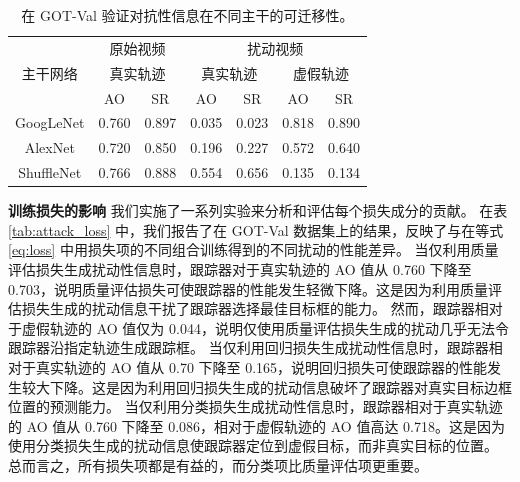 \begin{table}[t]
\centering
\caption{在 GOT-Val 验证对抗性信息在不同主干的可迁移性。}
\begin{tabular}{c cc cc cc} 
\toprule
\multirow{3}{*}[-6pt]{主干网络} & \multicolumn{2}{c}{原始视频}    & \multicolumn{4}{c}{扰动视频}                                        \\ 
\cmidrule(lr){2-3} \cmidrule(lr){4-7}
                          & \multicolumn{2}{c}{真实轨迹} & \multicolumn{2}{c}{真实轨迹} & \multicolumn{2}{c}{虚假轨迹}  \\ 
\cmidrule(lr){2-3} \cmidrule(lr){4-7}
                          & AO    & SR                           & AO    & SR                           & AO    & SR                           \\ 
\midrule
GoogLeNet                 & 0.760 & 0.897                        & 0.035 & 0.023                        & 0.818 & 0.890                        \\
AlexNet                   & 0.720 & 0.850                        & 0.196 & 0.227                        & 0.572 & 0.640                        \\
ShuffleNet                & 0.766 & 0.888                        & 0.554 & 0.656                        & 0.135 & 0.134                        \\
\bottomrule
\end{tabular}
\label{tab:backbone}
\end{table}

\textbf{训练损失的影响} 我们实施了一系列实验来分析和评估每个损失成分的贡献。
在表 \ref{tab:attack_loss} 中，我们报告了在 GOT-Val 数据集上的结果，反映了与在等式 \ref{eq:loss} 中用损失项的不同组合训练得到的不同扰动的性能差异。
当仅利用质量评估损失生成扰动性信息时，跟踪器对于真实轨迹的 AO 值从 0.760 下降至 0.703，说明质量评估损失可使跟踪器的性能发生轻微下降。这是因为利用质量评估损失生成的扰动信息干扰了跟踪器选择最佳目标框的能力。
然而，跟踪器相对于虚假轨迹的 AO 值仅为 0.044，说明仅使用质量评估损失生成的扰动几乎无法令跟踪器沿指定轨迹生成跟踪框。
当仅利用回归损失生成扰动性信息时，跟踪器相对于真实轨迹的 AO 值从 0.70 下降至 0.165，说明回归损失可使跟踪器的性能发生较大下降。这是因为利用回归损失生成的扰动信息破坏了跟踪器对真实目标边框位置的预测能力。
当仅利用分类损失生成扰动性信息时，跟踪器相对于真实轨迹的 AO 值从 0.760 下降至 0.086，相对于虚假轨迹的 AO 值高达 0.718。这是因为使用分类损失生成的扰动信息使跟踪器定位到虚假目标，而非真实目标的位置。
总而言之，所有损失项都是有益的，而分类项比质量评估项更重要。

